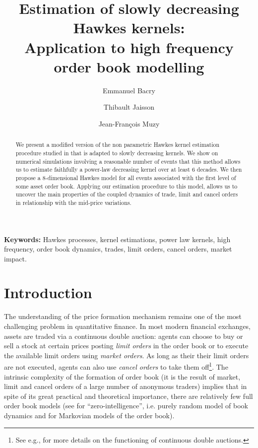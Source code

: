 \documentclass[a4paper,11pt]{article}
\title{Estimation of slowly decreasing Hawkes kernels: \\Application to high frequency order book modelling}
\author[1]{Emmanuel Bacry}
\author[1]{Thibault Jaisson}
\author[1,2]{Jean-Fran\c{c}ois Muzy}
\affil[1]{\small Centre de Math\'ematiques Appliqu\'ees, CNRS, \'Ecole Polytechnique, \authorcr UMR 7641, 91128 Palaiseau, France}
\affil[2]{\small Laboratoire Sciences Pour l'Environnement, CNRS, Universit\'e de Corse, \authorcr UMR 6134, 20250 Cort\'e, France}
\date{}  %
\begin{document}
\maketitle

\begin{abstract}
\noindent We present a modified version of the non parametric Hawkes kernel estimation procedure studied in \cite{bacry2014second} that is adapted to slowly decreasing kernels. We show on numerical simulations involving
a reasonable number of events that this method allows us to estimate
faithfully a power-law decreasing kernel over at least 6 decades.
We then propose a 8-dimensional Hawkes model for all events associated with the first level of some asset order book. Applying our estimation procedure to this model, allows us to uncover the main properties of the coupled
dynamics of trade, limit and cancel orders in relationship with the mid-price variations.
 \end{abstract}

\noindent \textbf{Keywords:} Hawkes processes, kernel estimations, power law kernels, high frequency, order book dynamics, trades, limit orders, cancel orders, market impact.

\section{Introduction}

The understanding of the price formation mechanism remains one of the most challenging problem in quantitative finance. In most modern financial exchanges, assets are traded via a continuous double auction: agents can choose to buy or sell a stock at certain prices posting \textit{limit orders} in the order book or to execute the available limit orders using \textit{market orders}. As long as their their limit orders are not executed, agents can also use \textit{cancel orders} to take them off\footnote{See e.g., \cite{cont2013price,farmer2003doubleauction} for more details on the functioning of continuous double auctions.}.
The intrinsic complexity of the formation of order book (it is the result of market, limit and cancel orders of a large number of anonymous traders) implies that in spite of its great practical and theoretical importance, there are relatively few full order book models (see \cite{rocsu2009dynamic,farmer2003doubleauction} for ``zero-intelligence'', i.e. purely random model of book dynamics and \cite{cont2013markov,gareche2013fokker,huang2013simulating} for Markovian models of the order book).\\
\end{document}
